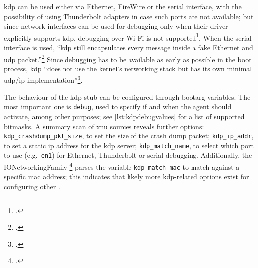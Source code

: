\gls{kdp} can be used either via Ethernet, FireWire or the serial interface, with the possibility of using Thunderbolt adapters in case such ports are not available; but since network interfaces can be used for debugging only when their driver explicitly supports \gls{kdp}, debugging over Wi-Fi is not supported\footcite{singh2006mac}. When the serial interface is used, \enquote{\gls{kdp} still encapsulates every message inside a fake Ethernet and \gls{udp} packet.}\footcite{miller2012ios} Since debugging has to be available as early as possible in the boot process, \gls{kdp} \enquote{does not use the kernel's networking stack but has its own minimal \gls{udp}/\gls{ip} implementation}\footcite{singh2006mac}.

The behaviour of the \gls{kdp} stub can be configured through \gls{bootarg} variables. The most important one is \lstinline{debug}, used to specify if and when the agent should activate, among other purposes; see \cref{lst:kdpdebugvalues} for a list of supported bitmasks. A summary scan of \gls{xnu} sources reveals further options: \lstinline{kdp_crashdump_pkt_size}, to set the size of the crash dump packet; \lstinline{kdp_ip_addr}, to set a static \gls{ip} address for the \gls{kdp} server; \lstinline{kdp_match_name}, to select which port to use (e.g.\ \lstinline{en1}) for Ethernet, Thunderbolt or serial debugging. Additionally, the IONetworkingFamily \footcite{IONetworkingFamily} parses the variable \lstinline{kdp_match_mac} to match against a specific \gls{mac} address; this indicates that likely more \gls{kdp}-related options exist for configuring other .



